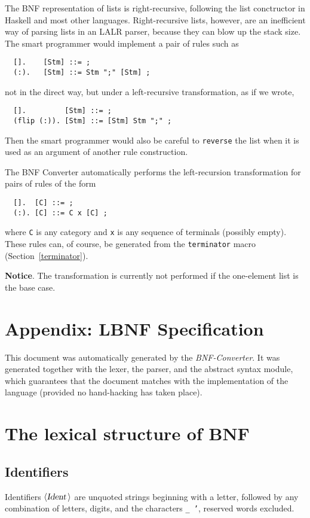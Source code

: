 \documentclass[10pt]{article}
\newcommand{\nonterminal}[1]{\mbox{$\langle \mbox{{\sl #1 }} \! \rangle$}}
\begin{document}
The BNF representation of lists is right-recursive, following the
list conctructor in Haskell and most other languages.
Right-recursive lists, however, are an inefficient way of parsing
lists in an LALR parser, because they can blow up the stack size.
The smart programmer would implement a pair of rules
such as
\begin{verbatim}
  [].    [Stm] ::= ;
  (:).   [Stm] ::= Stm ";" [Stm] ;
\end{verbatim}
not in the direct way,
but under a left-recursive transformation, as if we wrote,
\begin{verbatim}
  [].         [Stm] ::= ;
  (flip (:)). [Stm] ::= [Stm] Stm ";" ;
\end{verbatim}
Then the smart programmer would also be careful to {\tt reverse} the list
when it is used as an argument of another rule construction.

The BNF Converter automatically performs the
left-recursion transformation for
pairs of rules of the form
\begin{verbatim}
  [].  [C] ::= ;
  (:). [C] ::= C x [C] ;
\end{verbatim}
where {\tt C} is any category and {\tt x} is any sequence of
terminals (possibly empty). These rules can, of course, be generated from
the {\tt terminator} macro (Section~\ref{terminator}).

{\bf Notice}. The transformation is currently not performed if the
one-element list is the base case.


\newpage

\section*{Appendix: LBNF Specification}

This document was automatically generated by the {\em BNF-Converter}. It was generated together with the lexer, the parser, and the abstract syntax module, which guarantees that the document matches with the implementation of the language (provided no hand-hacking has taken place).

\section*{The lexical structure of BNF}
\subsection*{Identifiers}
Identifiers \nonterminal{Ident} are unquoted strings beginning with a letter,
followed by any combination of letters, digits, and the characters {\tt \_ '},
reserved words excluded.
\end{document}
